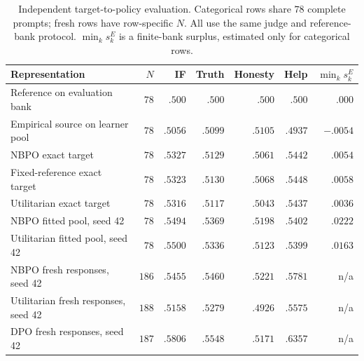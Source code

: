 \documentclass{article}
\theoremstyle{remark}
\theoremstyle{plain}
\begin{document}
\begin{table}[t]
\centering\scriptsize
\setlength{\tabcolsep}{4pt}
\caption{Independent target-to-policy evaluation. Categorical rows share $78$ complete prompts; fresh rows have row-specific $N$. All use the same judge and reference-bank protocol. $\min_k s_k^E$ is a finite-bank surplus, estimated only for categorical rows.}
\label{tab:target-transfer}
\begin{tabular}{lrrrrrr}
\toprule
Representation & $N$ & IF & Truth & Honesty & Help & $\min_k s_k^{E}$\\
\midrule
Reference on evaluation bank & $78$ & $.500$ & $.500$ & $.500$ & $.500$ & $.000$\\
Empirical source on learner pool & $78$ & $.5056$ & $.5099$ & $.5105$ & $.4937$ & $-.0054$\\
\addlinespace
NBPO exact target & $78$ & $.5327$ & $.5129$ & $.5061$ & $.5442$ & $.0054$\\
Fixed-reference exact target & $78$ & $.5323$ & $.5130$ & $.5068$ & $.5448$ & $.0058$\\
Utilitarian exact target & $78$ & $.5316$ & $.5117$ & $.5043$ & $.5437$ & $.0036$\\
\addlinespace
NBPO fitted pool, seed 42 & $78$ & $.5494$ & $.5369$ & $.5198$ & $.5402$ & $.0222$\\
Utilitarian fitted pool, seed 42 & $78$ & $.5500$ & $.5336$ & $.5123$ & $.5399$ & $.0163$\\
\addlinespace
NBPO fresh responses, seed 42 & $186$ & $.5455$ & $.5460$ & $.5221$ & $.5781$ & n/a\\
Utilitarian fresh responses, seed 42 & $188$ & $.5158$ & $.5279$ & $.4926$ & $.5575$ & n/a\\
DPO fresh responses, seed 42 & $187$ & $.5806$ & $.5548$ & $.5171$ & $.6357$ & n/a\\
\bottomrule
\end{tabular}
\end{table}
\end{document}
